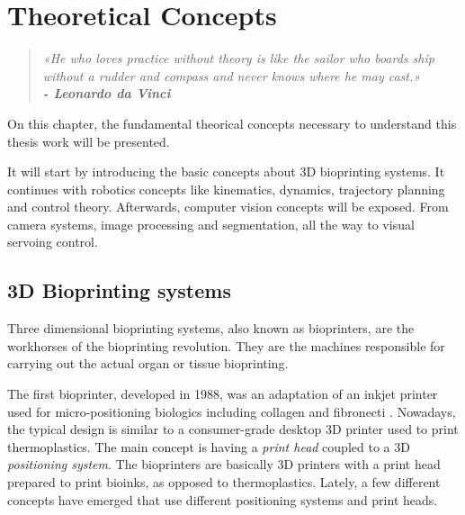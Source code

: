 \chapter{Theoretical Concepts}
\label{cha:theoretical_concepts}

\begin{quotation}
\begin{flushright}
\itshape
«He who loves practice without theory is like the sailor who boards ship without a rudder and compass and never knows where he may cast.»\\
\textbf{- Leonardo da Vinci}
\end{flushright}
\end{quotation}

On this chapter, the fundamental theorical concepts necessary to understand this thesis work will be presented.

It will start by introducing the basic concepts about 3D bioprinting systems. It continues with robotics concepts like kinematics, dynamics, trajectory planning and control theory. Afterwards, computer vision concepts will be exposed. From camera systems, image processing and segmentation, all the way to visual servoing control.


\section{3D Bioprinting systems}
\label{sec:3d_bioprinting_systems}

Three dimensional bioprinting systems, also known as bioprinters, are the workhorses of the bioprinting revolution. They are the machines responsible for carrying out the actual organ or tissue bioprinting. 

The first bioprinter, developed in 1988, was an adaptation of an inkjet printer used for micro-positioning biologics including collagen and fibronecti \cite{Klebe1988_first_bioprinter}. Nowadays, the typical design is similar to a consumer-grade desktop 3D printer used to print thermoplastics. The main concept is having a \emph{print head} coupled to a 3D \emph{positioning system}. The bioprinters are basically 3D printers with a print head prepared to print bioinks, as opposed to thermoplastics. Lately, a few different concepts have emerged that use different positioning systems and print heads. 

